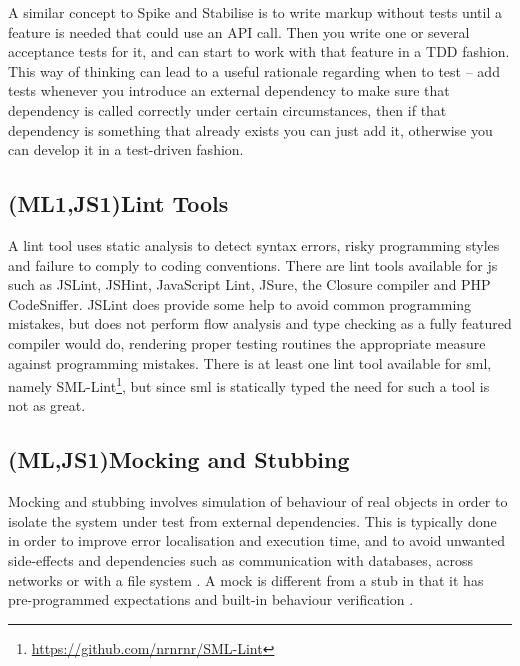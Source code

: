 \documentclass[11pt]{article}
\begin{document}
A similar concept to Spike and Stabilise is to write markup without tests until a feature is needed that could use an API call. Then you write one or several acceptance tests for it, and can start to work with that feature in a TDD fashion. \cite[question~30]{Ahnve} %
This way of thinking can lead to a useful rationale regarding when to test -- add tests whenever you introduce an external dependency to make sure that dependency is called correctly under certain circumstances, then if that dependency is something that already exists you can just add it, otherwise you can develop it in a test-driven fashion.

\subsection{(ML1,JS1)Lint Tools}
\label{subsec:Lint}

A lint tool uses static analysis to detect syntax errors, risky programming styles and failure to comply to coding conventions. There are lint tools available for \gls{js} such as JSLint, JSHint, JavaScript Lint, JSure, the Closure compiler and PHP CodeSniffer. JSLint does provide some help to avoid common programming mistakes, but does not perform flow analysis \cite{JSLint} and type checking as a fully featured compiler would do, rendering proper testing routines the appropriate measure against programming mistakes. There is at least one lint tool available for \gls{sml}, namely SML-Lint\footnote{\url{https://github.com/nrnrnr/SML-Lint}}, but since \gls{sml} is statically typed the need for such a tool is not as great.

\subsection{(ML,JS1)Mocking and Stubbing}
\label{subsec:mocking}

Mocking and stubbing involves simulation of behaviour of real objects in order to isolate the system under test from external dependencies. This is typically done in order to improve error localisation and execution time, and to avoid unwanted side-effects and dependencies such as communication with databases, across networks or with a file system \cite[ch.~2]{Legacy}. A mock is different from a stub in that it has pre-programmed expectations and built-in behaviour verification \cite[p.~453]{Tddjs}.
\end{document}

